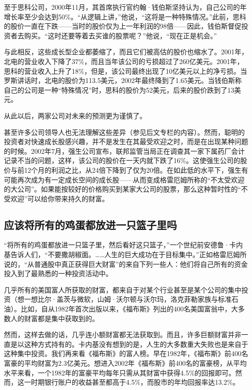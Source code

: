 \documentclass[12pt,oneside]{book}
\begin{document}
至于思科公司，2000年11月，其首席执行官约翰·钱伯斯坚持认为，自己公司的年增长率至少会达到50\%。“从逻辑上讲，”他说，“这将是一种特殊情况。”此前，思科的股价一直在下跌——当时的股价仅为上一年利润的98倍——因此，钱伯斯督促投资者去购买。“这时还要等着去买谁的股票呢？”他说，“现在正是机会。”

与此相反，这些成长型企业都萎缩了，而且它们被高估的股价也缩水了。2001年，北电的营业收入下降了37\%，而且当年该公司的亏损超过了260亿美元。2001年，思科的营业收入上升了18\%，但是，该公司最终出现了10亿美元以上的净亏损。当罗斯讲话时，北电的股价为113.5美元，2002年最终降到了1.65美元。当钱伯斯称自己的公司是一种“特殊情况”时，思科的股价为52美元，后来的股价跌到了13美元。

从此以后，两家公司对未来的预测更为谨慎了。

甚至许多公司领导人也无法理解这些差异（参见后文专栏的内容）。然而，聪明的投资者对快速成长股感兴趣，并不是发生在其最受欢迎之时，而是在出现某种问题的时候。2002年7月，强生公司宣布，联邦监管当局正在调查其一家下属药厂会计记录不当的问题，这样，该公司的股价在一天内就下跌了16\%。这使强生公司的股价与前12个月的利润之比，从24倍下降到了仅为20倍。在如此低的水平下，强生有可能再次成为有一定成长空间的成长股——从而变成格雷厄姆所称的“不太受欢迎的大公司”。如果能按较好的价格购买到某家大公司的股票，那么这种暂时性的“不受欢迎”可以给你带来持久的财富。

\subsection{应该将所有的鸡蛋都放进一只篮子里吗}
“将所有的鸡蛋都放进一只篮子里，然后看好这只篮子，”一个世纪前安德鲁·卡内基告诉人们，“不要撒胡椒面。……人生的巨大成功在于目标集中。”正如格雷厄姆所说的，“从普通股中真正获得巨大财富”的来自下列一些人：他们将自己所有的资金投入到了最熟悉的一种投资活动中。

几乎所有的美国富人所获取的财富，都来自于对某个行业甚至是某个公司的集中投资（想一想比尔·盖茨与微软，山姆·沃尔顿与沃尔玛，洛克菲勒家族与标准石油）。比如，自从1982年首次出版以来，《福布斯》列出的400名美国富翁中，大多数人的财富都是集中获取到的。

然而，这样去做的话，几乎连小额财富都无法获取到。而且，许多巨额财富并非一直是以这种方式持有的。卡内基没有想到的是，人生的大多数重大失败也是来自于这种集中投资。我们再来看《福布斯》的富人榜。早在1982年，《福布斯》前400名富豪的平均财富为2.3亿美元。想进入2002年《福布斯》前400名的富豪榜，从平均水平来看，一个1982年的富豪平均每年只需从其财富中获得4.5\%的回报即可。然而，这一时期银行账户的收益甚至都高于4.5\%，而股市的年均回报率达13.2\%。
\end{document}
